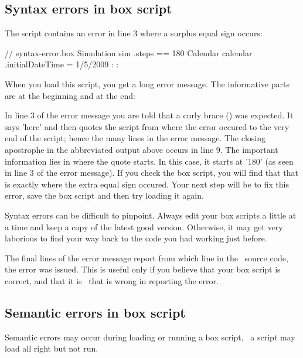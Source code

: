 \subsection{Syntax errors in box script}
The  script contains an error in line 3 where a surplus equal sign occurs:

\lstset{numbers=left}
\begin{boxscript}
// syntax-error.box
Simulation sim {
  .steps == 180
  Calendar calendar {
    .initialDateTime = 1/5/2009
  }
:
:
}
\end{boxscript}
\lstset{numbers=none}

When you load this script, you get a long error message. The informative parts are at the beginning and at the end:

\lstset{numbers=left}
\begin{userror}
> load book/syntax-error.box
Error! Expecting "}" here: "180
  Calendar calendar {
    .initialDateTime = 1/5/2009
  }
:
:
"
Parse failure
Load failed
Error: Construction failed
Source code: ..\..\..\..\UniSim2\src\plugins\%\brk%
>
\end{userror}
\lstset{numbers=none}

In line 3 of the error message you are told that a curly brace (\code{\}}) was expected. It says 'here' and then quotes the script from where the error occured to the very end of the script; hence the many lines in the error message. The closing apostrophe in the abbreviated output above occurs in line 9. The important information lies in where the quote starts. In this case, it starts at '180' (as seen in line 3 of the error message). If you check the box script, you will find that that is exactly where the extra equal sign occured. Your next step will be to fix this error, save the box script and then try loading it again.

Syntax errors can be difficult to pinpoint. Always edit your box scripts a little at a time and keep a copy of the latest good version. Otherwise, it may get very laborious to find your way back to the code you had working just before.

The final lines of the error message report from which line in the \US\ source code, the error was issued. This is useful only if you believe that your box script is correct, and that it is \US\ that is wrong in reporting the error.

\subsection{Semantic errors in box script}
Semantic errors may occur during loading or running a box script, \ie\ a script may load all right but not run.

